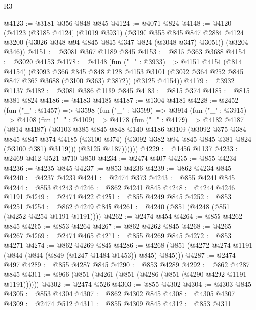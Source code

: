 \begin{lexlean}{R3}
\begin{coremodule}
@4123 := @3181 @356 @848 @845
@4124 := @4071 @824
@4148 := @4120
    (@4123
      (@3185 @4124)
      (@1019 @3931)
      (@3190
        @355
        @845
        @847
        @2884
        @4124
        @3200
        (@3026 @348 @94 @845 @845 @347 @824 (@3048 @347) @3051))
      (@3204 @346))
@4151 := @3081 @367 @1189 @845
@4153 := @815 @363 @3688
@4154 := @3020 @4153
@4178 := @4148
    (fun ("_" : @3933) =>
    @4151
      @4154
      (@814 @4154)
      (@3093
        @366
        @845
        @848
        @128
        @4153
        @3101
        (@3092 @364 @262 @845 @847 @363 @3688 (@3100 @363) @3872))
      (@3125 @4154))
@4179 := @3932 @1137
@4182 := @3081 @386 @1189 @845
@4183 := @815 @374
@4185 := @815 @381 @824
@4186 := @4183 @4185
@4187 := @1304 @4186
@4228 := @2452
    (fun ("_" : @1457) =>
    @3598
      (fun ("_" : @3599) =>
      @3914
        (fun ("_" : @3915) =>
        @4108
          (fun ("_" : @4109) =>
          @4178
            (fun ("_" : @4179) =>
            @4182
              @4187
              (@814 @4187)
              (@3103
                @385
                @845
                @848
                @140
                @4186
                @3109
                (@3092
                  @375
                  @384
                  @845
                  @847
                  @374
                  @4185
                  (@3100 @374)
                  (@3092 @382 @94 @845 @845 @381 @824 (@3100 @381) @3119)))
              (@3125 @4187))))))
@4229 := @1456 @1137
@4233 := @2469 @402 @521 @710 @850
@4234 := @2474 @407
@4235 := @855 @4234
@4236 := @4235 @845
@4237 := @853 @4236
@4239 := @862 @4234 @845
@4240 := @4237 @4239
@4241 := @2474 @373
@4243 := @855 @4241 @845
@4244 := @853 @4243
@4246 := @862 @4241 @845
@4248 := @4244 @4246 @1191
@4249 := @2474 @422
@4251 := @855 @4249 @845
@4252 := @853 @4251
@4254 := @862 @4249 @845
@4261 := @4240 (@851 (@4248 (@851 (@4252 @4254 @1191 @1191))))
@4262 := @2474 @454
@4264 := @855 @4262 @845
@4265 := @853 @4264
@4267 := @862 @4262 @845
@4268 := @4265 @4267
@4269 := @2474 @465
@4271 := @855 @4269 @845
@4272 := @853 @4271
@4274 := @862 @4269 @845
@4286 := @4268 (@851 (@4272 @4274 @1191 (@844 (@844 (@849 (@1247 @1484 @1453)) @845) @845)))
@4287 := @2474 @497
@4289 := @855 @4287 @845
@4290 := @853 @4289
@4292 := @862 @4287 @845
@4301 := @966 (@851 (@4261 (@851 (@4286 (@851 (@4290 @4292 @1191 @1191))))))
@4302 := @2474 @526
@4303 := @855 @4302
@4304 := @4303 @845
@4305 := @853 @4304
@4307 := @862 @4302 @845
@4308 := @4305 @4307
@4309 := @2474 @512
@4311 := @855 @4309 @845
@4312 := @853 @4311

\end{coremodule}
\end{lexlean}
